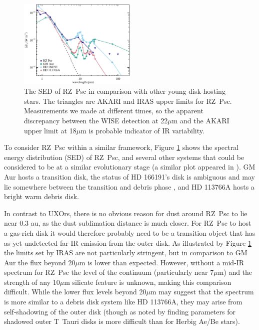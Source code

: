 \documentclass[]{rsos}
\begin{document}
\begin{figure}
  \begin{center}
    \hspace{-0.5cm} \includegraphics[width=0.5\textwidth]{figs/spcomp.eps}
    \caption{The SED of RZ~Psc in comparison with other young disk-hosting stars. The
      triangles are AKARI and IRAS upper limits for RZ~Psc. Measurements we made at
      different times, so the apparent discrepancy between the WISE detection at 22$\mu$m
      and the AKARI upper limit at 18$\mu$m is probable indicator of IR
      variability.}\label{fig:spcomp}
  \end{center}
\end{figure}

To consider RZ~Psc within a similar framework, Figure \ref{fig:spcomp} shows the spectral
energy distribution (SED) of RZ~Psc, and several other systems that could be considered
to be at a similar evolutionary stage (a similar plot appeared in
\cite{2014MNRAS.438.3299K}). GM Aur hosts a transition disk, the status of HD 166191's
disk is ambiguous and may lie somewhere between the transition and debris phase
\cite{2013ApJ...777...78S,2014MNRAS.438.3299K}, and HD 113766A hosts a bright warm debris
disk.

In contrast to UXOrs, there is no obvious reason for dust around RZ~Psc to lie near 0.3
au, as the dust sublimation distance is much closer. For RZ~Psc to host a gas-rich disk
it would therefore probably need to be a transition object that has as-yet undetected
far-IR emission from the outer disk. As illustrated by Figure \ref{fig:spcomp} the limits
set by IRAS are not particularly stringent, but in comparison to GM Aur the flux beyond
20$\mu$m is lower than expected. However, without a mid-IR spectrum for RZ~Psc the level
of the continuum (particularly near 7$\mu$m) and the strength of any 10$\mu$m silicate
feature is unknown, making this comparison difficult. While the lower flux levels beyond
20$\mu$m may suggest that the spectrum is more similar to a debris disk system like HD
113766A, they may arise from self-shadowing of the outer disk (though as noted by
\cite{2003ApJ...594L..47D} finding parameters for shadowed outer T~Tauri disks is more
difficult than for Herbig Ae/Be stars).
\end{document}
